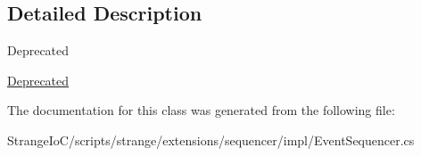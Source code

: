 \subsection{Detailed Description}
\begin{DoxyRefDesc}{Deprecated}
\item[\hyperlink{deprecated__deprecated000005}{Deprecated}]\end{DoxyRefDesc}


The documentation for this class was generated from the following file\-:\begin{DoxyCompactItemize}
\item 
Strange\-Io\-C/scripts/strange/extensions/sequencer/impl/Event\-Sequencer.\-cs\end{DoxyCompactItemize}
